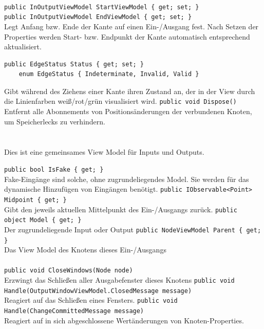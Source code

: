 \paragraph{}
\begin{itemize}
	\add \verb!public InOutputViewModel StartViewModel { get; set; }! \\
	     \verb!public InOutputViewModel EndViewModel { get; set; }! \\
	Legt Anfang bzw. Ende der Kante auf einen Ein-/Ausgang fest. Nach Setzen der Properties werden Start- bzw. Endpunkt der Kante automatisch entsprechend aktualisiert.
	\add \begin{verbatim}public EdgeStatus Status { get; set; }
	enum EdgeStatus { Indeterminate, Invalid, Valid }
	\end{verbatim}
	Gibt während des Ziehens einer Kante ihren Zustand an, der in der View durch die Linienfarben weiß/rot/grün visualisiert wird.
	\add \verb!public void Dispose()! \\
	Entfernt alle Abonnements von Positionsänderungen der verbundenen Knoten, um Speicherlecks zu verhindern.
\end{itemize}

\paragraph{}~\\
Dies ist eine gemeinsames View Model für Inputs und Outputs.
\begin{itemize}
	\add \verb!public bool IsFake { get; }! \\
	Fake-Eingänge sind solche, ohne zugrundeliegendes Model. Sie werden für das dynamische Hinzufügen von Eingängen benötigt.
	\add \verb!public IObservable<Point> Midpoint { get; }! \\
	Gibt den jeweils aktuellen Mittelpunkt des Ein-/Ausgangs zurück.
	\add \verb!public object Model { get; }! \\
	Der zugrundeliegende Input oder Output
	\add \verb!public NodeViewModel Parent { get; }! \\
	Das View Model des Knotens dieses Ein-/Ausgangs
\end{itemize}

\paragraph{}
\begin{itemize}
	\add \verb!public void CloseWindows(Node node)! \\
	Erzwingt das Schließen aller Ausgabefenster dieses Knotens
	\add \verb!public void Handle(OutputWindowViewModel.ClosedMessage message)! \\
	Reagiert auf das Schließen eines Fensters.
	\add \verb!public void Handle(ChangeCommittedMessage message)! \\
	Reagiert auf in sich abgeschlossene Wertänderungen von Knoten-Properties.
\end{itemize}

